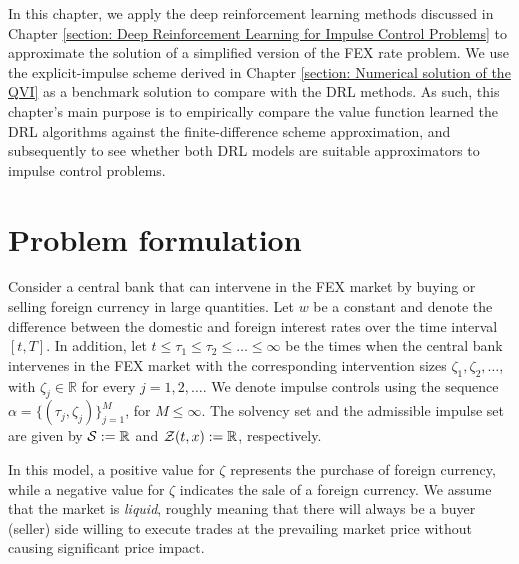 \label{section: Numerical Experiment I: Impulse Control of the Foreign Exchange Rate}
In this chapter, we apply the deep reinforcement learning methods discussed in Chapter \ref{section: Deep Reinforcement Learning for Impulse Control Problems} to approximate the solution of a simplified version of the FEX rate problem. We use the explicit-impulse scheme derived in Chapter \ref{section: Numerical solution of the QVI} as a benchmark solution to compare with the DRL methods. As such, this chapter's main purpose is to empirically compare the value function learned the DRL algorithms against the finite-difference scheme approximation, and subsequently to see whether both DRL models are suitable approximators to impulse control problems.

\section{Problem formulation}
Consider a central bank that can intervene in the FEX market by buying or selling foreign currency in large quantities. Let $w$ be a constant and denote the difference between the domestic and foreign interest rates over the time interval $[t,T]$. In addition, let $t \leq \tau_1 \leq \tau_2 \leq \ldots \leq \infty$ be the times when the central bank intervenes in the FEX market with the corresponding intervention sizes $\zeta_1, \zeta_2, \ldots$, with $\zeta_j \in \mathbb R$ for every $j = 1, 2, \ldots$. We denote impulse controls using the sequence $\alpha=\{(\tau_j, \zeta_j)\}_{j=1}^M$, for $M \leq \infty$. The solvency set and the admissible impulse set are given by $\mathcal{S}:= \mathbb{R}$ and $\mathcal{Z}(t,x) := \mathbb{R}$, respectively.

In this model, a positive value for $\zeta$ represents the purchase of foreign currency, while a negative value for $\zeta$ indicates the sale of a foreign currency. We assume that the market is \emph{liquid}, roughly meaning that there will always be a buyer (seller) side willing to execute trades at the prevailing market price without causing significant price impact.

